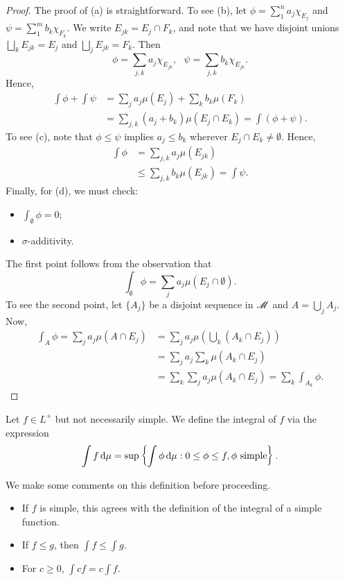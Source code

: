 \documentclass[12pt]{article} %
\begin{document}
\begin{proof}
    The proof of (a) is straightforward. To see (b), let $\phi = \sum_1^n a_j \chi_{E_j}$ and $\psi = \sum_1^m b_k \chi_{F_k}$. We write $E_{jk} = E_j \cap F_k$, and note that we have disjoint unions $\bigsqcup_k E_{jk} = E_j$ and $\bigsqcup_j E_{jk} = F_k$. Then \[\phi = \sum_{j, k} a_j \chi_{E_{jk}}, \ \ \ \psi = \sum_{j, k} b_k \chi_{E_{jk}}.\] Hence, \begin{align*}
        \int \phi + \int \psi &= \sum_j a_j \mu(E_j) + \sum_k b_k \mu(F_k) \\
        &= \sum_{j,k} (a_j + b_k) \mu(E_j \cap E_k) = \int (\phi + \psi).
    \end{align*}
    To see (c), note that $\phi \leq \psi$ implies $a_j \leq b_k$ wherever $E_j \cap E_k \neq \emptyset$. Hence, \begin{align*}
        \int \phi &= \sum_{j, k} a_j \mu(E_{jk}) \\
        &\leq \sum_{j,k} b_k \mu(E_{jk}) = \int \psi.
    \end{align*}
    Finally, for (d), we must check: \begin{itemize}
        \item $\int_\emptyset \phi = 0$;
        \item $\sigma$-additivity.
    \end{itemize}
    The first point follows from the observation that \[\int_\emptyset \phi = \sum_j a_j \mu(E_j \cap \emptyset).\] To see the second point, let $\{A_j\}$ be a disjoint sequence in $\mathscr{M}$ and $A = \bigcup_j A_j$. Now, \begin{align*}
        \int_A \phi = \sum_j a_j \mu(A \cap E_j) &= \sum_j a_j \mu\left(\bigcup_k (A_k \cap E_j)\right)\\
        &= \sum_j a_j \sum_k \mu(A_k \cap E_j)\\
        &= \sum_k \sum_j a_j \mu(A_k \cap E_j) = \sum_k \int_{A_k} \phi.
    \end{align*}
\end{proof}

\begin{definition}
    Let $f \in L^+$ but not necessarily simple. We define the integral of $f$ via the expression \[\int f \, \mathrm{d} \mu = \sup \left\{ \int \phi \, \mathrm{d} \mu : 0 \leq \phi \leq f, \phi \ \text{simple} \right\}.\]
\end{definition}

\begin{remark}
    We make some comments on this definition before proceeding. \begin{itemize}
        \item If $f$ is simple, this agrees with the definition of the integral of a simple function.
        \item If $f \leq g$, then $\int f \leq \int g$.
        \item For $c \geq 0$, $\int c f = c \int f$.
    \end{itemize}
\end{remark}
\end{document}
